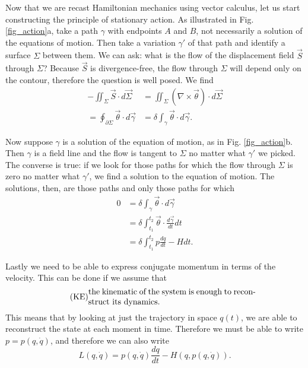 \documentclass[10pt,twocolumn, nofootinbib]{revtex4-2}
\begin{document}
Now that we are recast Hamiltonian mechanics using vector calculus, let us start constructing the principle of stationary action. As illustrated in Fig. \ref{fig_action}a, take a path $\gamma$ with endpoints $A$ and $B$, not necessarily a solution of the equations of motion. Then take a variation $\gamma'$ of that path and identify a surface $\Sigma$ between them. We can ask: what is the flow of the displacement field $\vec{S}$ through $\Sigma$? Because $\vec{S}$ is divergence-free, the flow through $\Sigma$ will depend only on the contour, therefore the question is well posed. We find
\begin{equation}\label{sdof_action}
\begin{aligned}
	- \iint_{\Sigma} \vec{S} \cdot d\vec{\Sigma} &= \iint_{\Sigma} \left( \nabla \times \vec{\theta} \right) \cdot d\vec{\Sigma} \\
	=  \oint_{\partial \Sigma} \vec{\theta}  \cdot d\vec{\gamma} 
	&= \delta \int_{\gamma} \vec{\theta} \cdot d\vec{\gamma}.
\end{aligned}
\end{equation}

Now suppose $\gamma$ is a solution of the equation of motion, as in Fig. \ref{fig_action}b. Then $\gamma$ is a field line and the flow is tangent to $\Sigma$ no matter what $\gamma'$ we picked. The converse is true: if we look for those paths for which the flow through $\Sigma$ is zero no matter what $\gamma'$, we find a solution to the equation of motion. The solutions, then, are those paths and only those paths for which
\begin{equation}\label{sdof_stationary_action}
	\begin{aligned}
		0 &=\delta \int_{\gamma} \vec{\theta} \cdot d\vec{\gamma} \\
		&= \delta \int^{t_2}_{t_1} \vec{\theta} \cdot \frac{d\vec{\gamma}}{dt} dt \\  
		&= \delta \int^{t_2}_{t_1} p \frac{dq}{dt} - H dt .		
	\end{aligned}
\end{equation}

Lastly we need to be able to express conjugate momentum in terms of the velocity. This can be done if we assume that 
\begin{align}\label{assum_kineq}
	\tag*{(KE)}
	\parbox{2.8in}{the kinematic of the system is enough to reconstruct its dynamics.}
\end{align}
This means that by looking at just the trajectory in space $q(t)$, we are able to reconstruct the state at each moment in time. Therefore we must be able to write $p=p(q,\dot{q})$, and therefore we can also write
\begin{equation}\label{sdof_Lagrangian}
	L(q, \dot{q}) = p(q, \dot{q}) \frac{dq}{dt} - H(q, p(q, \dot{q})).
\end{equation}
\end{document}
